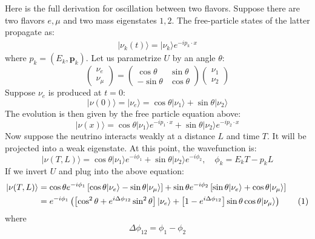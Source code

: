 \documentclass[11pt]{article}
\newcommand\numberthis{\addtocounter{equation}{1}\tag{\theequation}}
\newcommand{\p}{\mathbf{p}}
\newcommand{\ra}{\rangle}
\begin{document}
\noindent Here is the full derivation for oscillation between two flavors. Suppose there are two flavors $e,\mu$ and two mass eigenstates $1,2$. The free-particle states of the latter propagate as:
\begin{gather}
  |\nu_k(t)\ra = |\nu_k\ra e^{-i p_k\cdot x}
\end{gather}
where $p_k = (E_k,\p_k)$. Let us parametrize $U$ by an angle $\theta$:
\begin{equation}
  \begin{pmatrix} \nu_e \\ \nu_\mu \end{pmatrix} = 
  \begin{pmatrix} \cos \theta & \sin\theta \\ -\sin\theta & \cos\theta \end{pmatrix}
  \begin{pmatrix} \nu_1 \\ \nu_2 \end{pmatrix} 
\end{equation}
Suppose $\nu_e$  is produced at $t=0$:
\begin{equation}
  |\nu(0)\ra = |\nu_e \ra = \cos\theta|\nu_1\ra + \sin\theta|\nu_2\ra
\end{equation}
The evolution is then given by the free particle equation above:
\begin{equation}
  |\nu(x)\ra = \cos\theta |\nu_1\ra e^{-ip_1\cdot x} + \sin\theta |\nu_2\ra e^{-ip_2\cdot x}
\end{equation}
Now suppose the neutrino interacts weakly at a distance $L$ and time $T$. It will be projected into a weak eigenstate. At this point, the wavefunction is:
\begin{equation}
  |\nu(T,L)\ra = \cos\theta |\nu_1\ra e^{-i\phi_1} + \sin\theta |\nu_2\ra e^{-i\phi_2}, \quad \phi_k = E_k T - p_k L
\end{equation}
If we invert $U$ and plug into the above equation:
\begin{align*}
  |\nu(T,L)\ra &= \cos\theta e^{-i\phi_1}\left[\cos\theta |\nu_e\ra - \sin\theta|\nu_\mu\ra\right] + \sin\theta e^{-i\phi_2}\left[\sin\theta |\nu_e\ra + \cos\theta|\nu_\mu\ra\right]\\
  &= e^{-i\phi_1} \left( \left[\cos^2\theta+ e^{i\Delta\phi_{12}}\sin^2\theta\right]|\nu_e\ra + \left[1-e^{i\Delta\phi_{12}}\right]\sin\theta\cos\theta|\nu_\mu\ra \right) \numberthis
\end{align*}
where
\begin{equation}
  \Delta\phi_{12} = \phi_1 - \phi_2
\end{equation}
\end{document}
